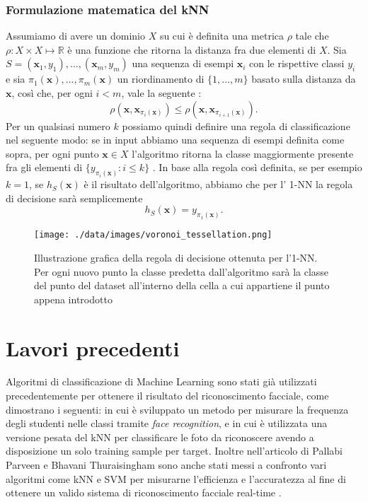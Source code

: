 \subsubsection{Formulazione matematica del kNN} 
Assumiamo di avere un dominio $X$ su cui è definita una metrica $\rho$ tale che $\rho:X\times X \mapsto \mathbb{R}$ è una funzione che ritorna la distanza fra due elementi di $X$. Sia $S=(\pmb{x}_{1},y_{1}),\dots,(\pmb{x}_{m},y_{m})$ una sequenza di esempi $\pmb{x}_{i}$ con le rispettive classi $y_{i}$ e sia $\pi_{1}(\pmb{x}),\dots,\pi_{m}(\pmb{x})$ un riordinamento di $\{1,\dots,m\}$ basato sulla distanza da $\pmb{x}$, così che, per ogni $i<m$, vale la seguente \cite{shalev2014understanding}:
\begin{equation}
	\rho(\pmb{x},\pmb{x}_{\pi_{i}(\pmb{x})}) \le \rho(\pmb{x},\pmb{x}_{\pi_{i+1}(\pmb{x})}).
\end{equation}
Per un qualsiasi numero $k$ possiamo quindi definire una regola di classificazione nel seguente modo: se in input abbiamo una sequenza di esempi definita come sopra, per ogni punto $\pmb{x}\in X$ l'algoritmo ritorna la classe maggiormente presente fra gli elementi di $\{y_{\pi_{i}(\pmb{x})} : i \le k\}$ \cite{shalev2014understanding}. In base alla regola così definita, se per esempio $k=1$, se $h_{S}(\pmb{x})$ è il risultato dell'algoritmo, abbiamo che per l' 1-NN la regola di decisione sarà semplicemente
\begin{equation}
	h_{S}(\pmb{x}) = y_{\pi_{1}(\pmb{x})}.
\end{equation} 
\begin{figure}
	\centering
	\texttt{[image: ./data/images/voronoi\_tessellation.png]}
	\caption{Illustrazione grafica della regola di decisione ottenuta per l'1-NN. Per ogni nuovo punto la classe predetta dall'algoritmo sarà la classe del punto del dataset all'interno della cella a cui appartiene il punto appena introdotto \cite{shalev2014understanding}}
	\label{voronoi}
\end{figure}

\section{Lavori precedenti}
Algoritmi di classificazione di Machine Learning sono stati già utilizzati precedentemente per ottenere il risultato del riconoscimento facciale, come dimostrano i seguenti: \cite{santoso2017efficient} in cui è sviluppato un metodo per misurare la frequenza degli studenti nelle classi tramite \textit{face recognition}, e \cite{farsi2014fast} in cui è utilizzata una versione pesata del kNN per classificare le foto da riconoscere avendo a disposizione un solo training sample per target. Inoltre nell'articolo di Pallabi Parveen e Bhavani Thuraisingham sono anche stati messi a confronto vari algoritmi come kNN e SVM per misurarne l'efficienza e l'accuratezza al fine di ottenere un valido sistema di riconoscimento facciale real-time \cite{parveen2006face}.

